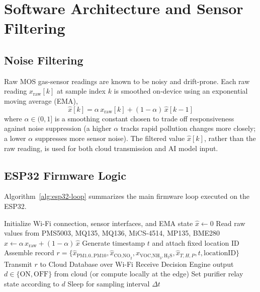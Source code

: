 \FloatBarrier

\section{Software Architecture and Sensor Filtering}
\label{sec:meth-software}

\subsection{Noise Filtering}
\label{sec:meth-filtering}
Raw MOS gas-sensor readings are known to be noisy and drift-prone. Each raw reading $x_{\text{raw}}[k]$ at sample index $k$ is smoothed on-device using an exponential moving average (EMA),
\begin{equation}
\hat{x}[k] = \alpha\, x_{\text{raw}}[k] + (1-\alpha)\, \hat{x}[k-1]
\label{eq:ema}
\end{equation}
where $\alpha \in (0,1]$ is a smoothing constant chosen to trade off responsiveness against noise suppression (a higher $\alpha$ tracks rapid pollution changes more closely; a lower $\alpha$ suppresses more sensor noise). The filtered value $\hat{x}[k]$, rather than the raw reading, is used for both cloud transmission and AI model input.

\subsection{ESP32 Firmware Logic}
Algorithm~\ref{alg:esp32-loop} summarizes the main firmware loop executed on the ESP32.

\begin{algorithm}[htbp]
\caption{ESP32 Main Sensing and Transmission Loop}
\label{alg:esp32-loop}
\begin{algorithmic}[1]
\State Initialize Wi-Fi connection, sensor interfaces, and EMA state $\hat{x} \leftarrow 0$
\Loop
    \State Read raw values from PMS5003, MQ135, MQ136, MiCS-4514, MP135, BME280
        \State $\hat{x} \leftarrow \alpha\, x_{\text{raw}} + (1-\alpha)\, \hat{x}$ 
    \EndFor
    \State Generate timestamp $t$ and attach fixed location ID
    \State Assemble record $r = \{\hat{x}_{\text{PM1.0..PM10}}, \hat{x}_{\text{CO,NO}_2}, \hat{x}_{\text{VOC,NH}_3,\text{H}_2\text{S}}, \hat{x}_{T,H,P}, t, \text{locationID}\}$ 
    \State Transmit $r$ to Cloud Database over Wi-Fi
    \State Receive Decision Engine output $d \in \{\text{ON}, \text{OFF}\}$ from cloud (or compute locally at the edge)
    \State Set purifier relay state according to $d$
    \State Sleep for sampling interval $\Delta t$
\EndLoop
\end{algorithmic}
\end{algorithm}

